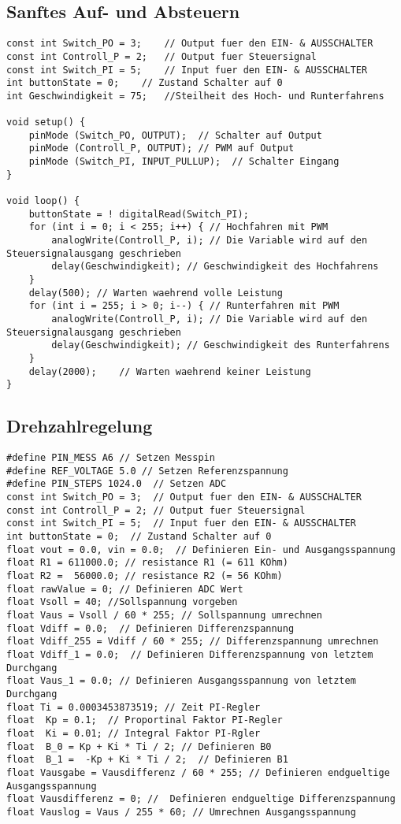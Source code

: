 \begin{appendix}
\newpage
\subsection*{Sanftes Auf- und Absteuern}
\begin{lstlisting}[basicstyle=\tiny,style=myArduino]
const int Switch_PO = 3;	// Output fuer den EIN- & AUSSCHALTER
const int Controll_P = 2;	// Output fuer Steuersignal
const int Switch_PI = 5;	// Input fuer den EIN- & AUSSCHALTER
int buttonState = 0;	// Zustand Schalter auf 0
int Geschwindigkeit = 75;	//Steilheit des Hoch- und Runterfahrens

void setup() {
	pinMode (Switch_PO, OUTPUT);  // Schalter auf Output
	pinMode (Controll_P, OUTPUT); // PWM auf Output
	pinMode (Switch_PI, INPUT_PULLUP);  // Schalter Eingang
}

void loop() {
	buttonState = ! digitalRead(Switch_PI);
	for (int i = 0; i < 255; i++) {	// Hochfahren mit PWM
		analogWrite(Controll_P, i);	// Die Variable wird auf den Steuersignalausgang geschrieben
		delay(Geschwindigkeit);	// Geschwindigkeit des Hochfahrens
	}
	delay(500);	// Warten waehrend volle Leistung
	for (int i = 255; i > 0; i--) {	// Runterfahren mit PWM
		analogWrite(Controll_P, i);	// Die Variable wird auf den Steuersignalausgang geschrieben
		delay(Geschwindigkeit);	// Geschwindigkeit des Runterfahrens
	}
	delay(2000);	// Warten waehrend keiner Leistung
}
\end{lstlisting}

\subsection*{Drehzahlregelung}\label{sec:Drehzahlregelung}
\begin{lstlisting}[basicstyle=\tiny,style=myArduino]
#define PIN_MESS A6 // Setzen Messpin
#define REF_VOLTAGE 5.0 // Setzen Referenzspannung
#define PIN_STEPS 1024.0  // Setzen ADC
const int Switch_PO = 3;  // Output fuer den EIN- & AUSSCHALTER
const int Controll_P = 2; // Output fuer Steuersignal
const int Switch_PI = 5;  // Input fuer den EIN- & AUSSCHALTER
int buttonState = 0;  // Zustand Schalter auf 0
float vout = 0.0, vin = 0.0;  // Definieren Ein- und Ausgangsspannung
float R1 = 611000.0; // resistance R1 (= 611 KOhm)
float R2 =  56000.0; // resistance R2 (= 56 KOhm)
float rawValue = 0; // Definieren ADC Wert
float Vsoll = 40; //Sollspannung vorgeben
float Vaus = Vsoll / 60 * 255; // Sollspannung umrechnen
float Vdiff = 0.0;  // Definieren Differenzspannung
float Vdiff_255 = Vdiff / 60 * 255; // Differenzspannung umrechnen
float Vdiff_1 = 0.0;  // Definieren Differenzspannung von letztem Durchgang
float Vaus_1 = 0.0; // Definieren Ausgangsspannung von letztem Durchgang
float Ti = 0.0003453873519; // Zeit PI-Regler
float  Kp = 0.1;  // Proportinal Faktor PI-Regler
float  Ki = 0.01; // Integral Faktor PI-Rgler
float  B_0 = Kp + Ki * Ti / 2; // Definieren B0
float  B_1 =  -Kp + Ki * Ti / 2;  // Definieren B1
float Vausgabe = Vausdifferenz / 60 * 255; // Definieren endgueltige Ausgangsspannung
float Vausdifferenz = 0; //  Definieren endgueltige Differenzspannung
float Vauslog = Vaus / 255 * 60; // Umrechnen Ausgangsspannung


\end{lstlisting}
\end{appendix}
